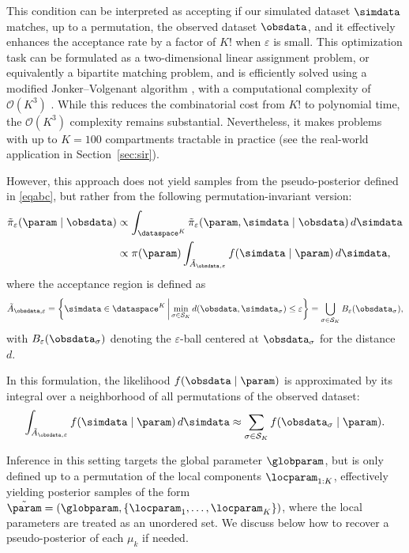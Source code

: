 This condition can be interpreted as accepting if our simulated dataset $\simdata$ matches, up to a permutation, the observed dataset $\obsdata$, and it effectively enhances the acceptance rate by a factor of $K!$ when $\varepsilon$ is small. This optimization task can be formulated as a two-dimensional linear assignment problem, or equivalently a bipartite matching problem, and is efficiently solved using a modified Jonker--Volgenant algorithm \citep{jonker1987shortest}, with a computational complexity of $\mathcal{O}(K^3)$ \citep{crouseImplementing2DRectangular2016a}. While this reduces the combinatorial cost from $K!$ to polynomial time, the $\mathcal{O}(K^3)$ complexity remains substantial. Nevertheless, it makes problems with up to $K = 100$ compartments tractable in practice (see the real-world application in Section~\ref{sec:sir}).

However, this approach does not yield samples from the pseudo-posterior defined in \eqref{eqabc}, but rather from the following permutation-invariant version:
\begin{equation} 
    \label{eqpermabc_tilde}
    \begin{split}
        \Tilde \pi_{\varepsilon} (\param \mid \obsdata)  & \propto \int_{\dataspace^K} \Tilde \pi_{\varepsilon} (\param , \simdata \mid \obsdata) \, d\simdata \\
        & \propto \pi(\param) \int_{\Tilde A_{\obsdata,\varepsilon}} f(\simdata \mid \param) \, d\simdata,
    \end{split}
\end{equation}
where the acceptance region is defined as
\[
\tilde{A}_{\obsdata,\varepsilon} = \left\{\simdata \in \dataspace^K \,\middle|\, \min_{\sigma \in \mathcal{S}_K} d(\obsdata, \simdata_{\sigma}) \leq \varepsilon \right\} = \bigcup_{\sigma \in \mathcal{S}_K} B_{\varepsilon}(\obsdata_{\sigma}),
\]
with \( B_{\varepsilon}(\obsdata_{\sigma}) \) denoting the \( \varepsilon \)-ball centered at \( \obsdata_{\sigma} \) for the distance \( d \).

In this formulation, the likelihood \( f(\obsdata \mid \param) \) is approximated by its integral over a neighborhood of all permutations of the observed dataset:
\[
\int_{\tilde{A}_{\obsdata,\varepsilon}} f(\simdata \mid \param) \, d\simdata \approx \sum_{\sigma \in \mathcal{S}_K} f(\obsdata_{\sigma} \mid \param).
\]

Inference in this setting targets the global parameter \( \globparam \), but is only defined up to a permutation of the local components \( \locparam_{1:K} \), effectively yielding posterior samples of the form \( \Tilde{\param} = (\globparam, \{\locparam_1, \dots, \locparam_K\})\), where the local parameters are treated as an unordered set.  We discuss below how to recover a pseudo-posterior of each $\mu_k$ if needed.

